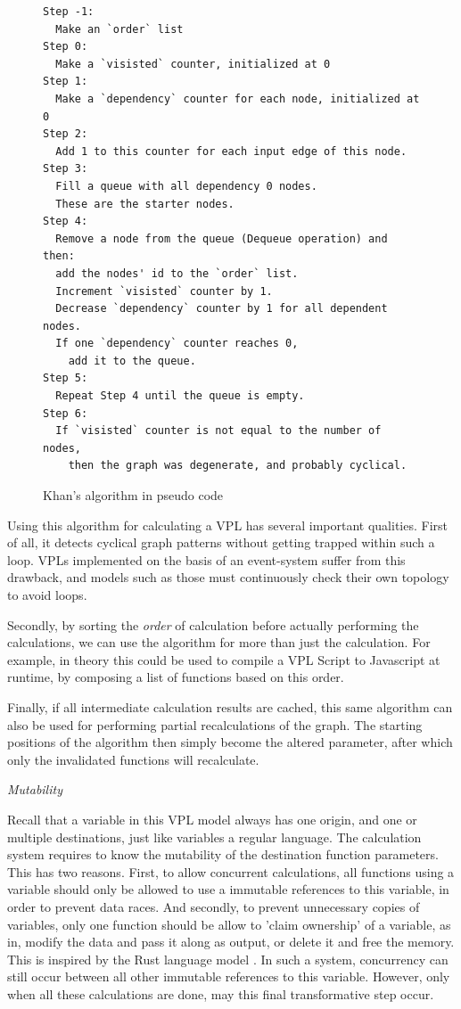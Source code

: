 \begin{figure}
\centering
\begin{lstlisting}
Step -1: 
  Make an `order` list
Step 0: 
  Make a `visisted` counter, initialized at 0
Step 1: 
  Make a `dependency` counter for each node, initialized at 0
Step 2: 
  Add 1 to this counter for each input edge of this node.
Step 3: 
  Fill a queue with all dependency 0 nodes. 
  These are the starter nodes.
Step 4: 
  Remove a node from the queue (Dequeue operation) and then:
  add the nodes' id to the `order` list.
  Increment `visisted` counter by 1.
  Decrease `dependency` counter by 1 for all dependent nodes.
  If one `dependency` counter reaches 0, 
    add it to the queue.
Step 5: 
  Repeat Step 4 until the queue is empty.
Step 6: 
  If `visisted` counter is not equal to the number of nodes, 
    then the graph was degenerate, and probably cyclical. 
\end{lstlisting}
\caption[Kahns algorithm]{Khan's algorithm in pseudo code}
\label{fig:kahn}
\end{figure}

Using this algorithm for calculating a VPL has several important qualities. 
First of all, it detects cyclical graph patterns without getting trapped within such a loop. 
VPLs implemented on the basis of an event-system suffer from this drawback, and models such as those must continuously check their own topology to avoid loops. 

Secondly, by sorting the \emph{order} of calculation before actually performing the calculations, we can use the algorithm for more than just the calculation.
For example, in theory this could be used to compile a VPL Script to Javascript at runtime, by composing a list of functions based on this order. 

Finally, if all intermediate calculation results are cached, this same algorithm can also be used for performing partial recalculations of the graph. 
The starting positions of the algorithm then simply become the altered parameter, after which only the invalidated functions will recalculate. 

\emph{Mutability}

Recall that a variable in this VPL model always has one origin, and one or multiple destinations, just like variables a regular language.
The calculation system requires to know the mutability of the destination function parameters. 
This has two reasons.
First, to allow concurrent calculations, all functions using a variable should only be allowed to use a immutable references to this variable, in order to prevent data races. 
And secondly, to prevent unnecessary copies of variables, only one function should be allow to 'claim ownership' of a variable, as in, modify the data and pass it along as output, or delete it and free the memory. 
This is inspired by the Rust language model \citep{contributors_what_2022}. 
In such a system, concurrency can still occur between all other immutable references to this variable.
However, only when all these calculations are done, may this final transformative step occur.

